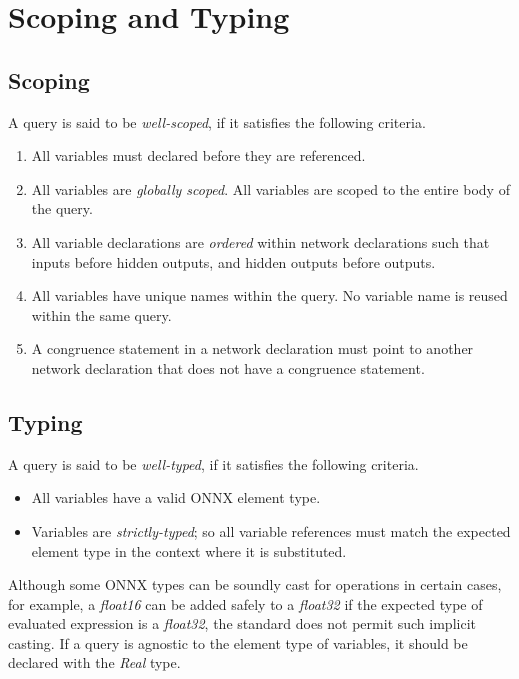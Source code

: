 \section{Scoping and Typing}
\label{sec:scoping_and_typing}

\subsection{Scoping}
A \vnnlib{} query is said to be \textit{well-scoped}, if it satisfies the following criteria.
\begin{enumerate}
    \item All variables must declared before they are referenced.
    \item All variables are \textit{globally scoped}. All variables are scoped to the entire body of the query.
    \item All variable declarations are \textit{ordered} within network declarations such that inputs before hidden outputs, and hidden outputs before outputs.
    \item All variables have unique names within the query. No variable name is reused within the same query.
    \item A congruence statement in a network declaration must point to another network declaration that does not have a congruence statement.
\end{enumerate}

\subsection{Typing}
A \vnnlib{} query is said to be \textit{well-typed}, if it satisfies the following criteria.

\begin{itemize}
    \item All variables have a valid ONNX element type.
    \item Variables are \textit{strictly-typed}; so all variable references must match the expected element type in the context where it is substituted.
\end{itemize}

Although some ONNX types can be soundly cast for operations in certain cases, for example, a \textit{float16} can be added safely to a \textit{float32} if the expected type of evaluated expression is a \textit{float32}, the \vnnlib{} standard does not permit such implicit casting.
If a query is agnostic to the element type of variables, it should be declared with the \textit{Real} type.

